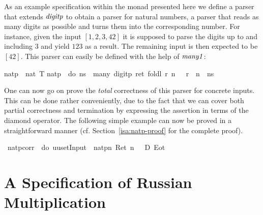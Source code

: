 As an example specification within the monad presented here we define a parser
that extends $\mathit{digitp}$ to obtain a parser for natural numbers, \IE a parser
that reads as many digits as possible and turns them into the corresponding
number.  For instance, given the input $[1, 2, 3, 42]$ it is supposed to parse
the digits up to and including $3$ and yield $123$ as a result. The remaining
input is then expected to be $[42]$. This parser can easily be defined with the
help of $\mathit{many1}$:
\begin{isabellebody}
\isanewline
{}\isanewline
natp\ {\isacharcolon}{\isacharcolon}\ {\isachardoublequote}nat\ T{\isachardoublequote}\isanewline
{\isachardoublequote}natp\ {\isasymequiv}\ do\ {\isacharbraceleft}ns\ {\isasymleftarrow}\ many{}\ digitp{\isacharsemicolon}\ ret\ {\isacharparenleft}foldl\ {\isacharparenleft}{\isasymlambda}r\ n{\isachardot}\ {}{}\ {\isacharasterisk}\ r\ {\isacharplus}\ n{\isacharparenright}\ {}\ ns{\isacharparenright}{\isacharbraceright}{\isachardoublequote}\isamarkupfalse%
\isanewline
\end{isabellebody}

One can now go on prove the \emph{total} correctness of this parser for concrete
inputs. This can be done rather conveniently, due to the fact that we can cover
both partial correctness and termination by expressing the assertion in terms of
the diamond operator. The following simple example can now be proved in a
straightforward manner (cf. Section~\ref{isa:natp-proof} for the complete proof).
\begin{isabellebody}
\isanewline
{}\ natp{\isacharunderscore}corr{\isacharcolon}\ {\isachardoublequote}{\isasymturnstile}\ {\isasymlangle}do\ {\isacharbraceleft}uu{\isasymleftarrow}setInput\ {\isacharbrackleft}{}{\isacharbrackright}{\isacharsemicolon}\ natp{\isacharbraceright}{\isasymrangle}{\isacharparenleft}{\isasymlambda}n{\isachardot}\ Ret\ {\isacharparenleft}n\ {\isacharequal}\ {}{\isacharparenright}\ {\isasymand}\isactrlsub D\ Eot{\isacharparenright}{\isachardoublequote}\isanewline
\end{isabellebody}



\section{A Specification of Russian Multiplication}
\label{sec:spec-russ-mult}

